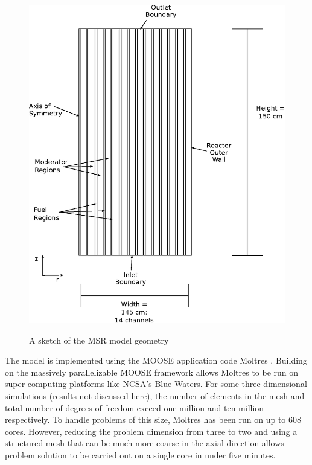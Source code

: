 \documentclass{article}
\begin{document}
\begin{figure}
  \centering
  \includegraphics{geometry.eps}
  \label{fig:geom}
  \caption{A sketch of the \gls{MSR} model geometry}
\end{figure}

The model is implemented using the \gls{MOOSE} \cite{gaston_physics-based_2015} application code
Moltres \cite{lindsay_arfc/moltres_nodate}. Building on the massively
parallelizable \gls{MOOSE} framework allows Moltres to be run on super-computing
platforms like \gls{NCSA}'s Blue Waters. For some three-dimensional simulations
(results not discussed here), the number of elements in the mesh and total
number of degrees of freedom exceed one million and ten million respectively. To
handle problems of this size, Moltres has been run on up to 608 cores. However,
reducing the problem dimension from three to two and using a structured mesh
that can be much more coarse in the axial direction allows problem solution to
be carried out on a single core in under five minutes.
\end{document}
